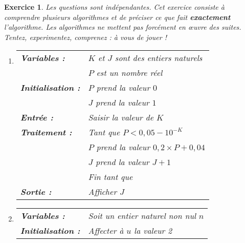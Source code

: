 \documentclass[10pt]{article}
\theoremstyle{exostyle}
\newtheorem{exercice}{Exercice}
\begin{document}
\begin{exercice}
    Les questions sont indépendantes. Cet exercice consiste à comprendre plusieurs algorithmes et de préciser ce que fait \textbf{exactement} l'algorithme. Les algorithmes ne mettent pas forcément en \oe{}uvre des suites. Tentez, experimentez, comprenez : à vous de jouer !
    \begin{enumerate}
        \item \begin{center}
                  \begin{tabularx}{0.7\linewidth}{|l|X|}\hline
                      \textbf{Variables :}      & $K$ et $J$ sont des entiers naturels            \\
                                                & $P$ est un nombre réel                          \\
                      \textbf{Initialisation :} & $P$ prend la valeur $0$                         \\
                                                & $J$ prend la valeur $1$                         \\
                      \textbf{Entrée :}         & Saisir la valeur de $K$                         \\
                      \textbf{Traitement :}     & Tant que $P< 0,05 - 10^{- K}$                   \\
                                                & \quad $P$ prend la valeur $0,2 \times P + 0,04$ \\
                                                & \quad  $J$ prend la valeur $J+ 1$               \\
                                                & Fin tant que                                    \\
                      \textbf{Sortie :}         & Afficher $J$                                    \\ \hline
                  \end{tabularx}
              \end{center}
              \vspace{0.25cm}
        \item \begin{center}
                  \begin{tabularx}{0.7\linewidth}{|l|X|}\hline
                      \textbf{Variables :}             & Soit un entier naturel non nul $n$                     \\
                      \textbf{Initialisation :}        & Affecter à $u$ la valeur 2                             \\

\end{tabularx}
\end{center}
\end{enumerate}
\end{exercice}
\end{document}
